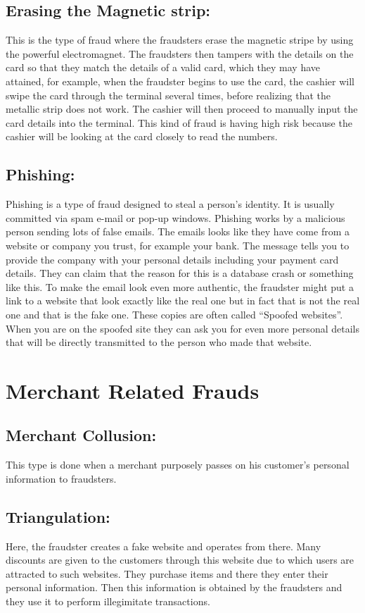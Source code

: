 \documentclass{report}
\begin{document}
\subsection{Erasing the Magnetic strip:}
This is the type of fraud where the fraudsters erase the magnetic stripe by using the powerful electromagnet. The fraudsters then tampers with the details on the card so that they match the details of a valid card, which they may have attained, for example, when the fraudster begins to use the card, the cashier will swipe the card through the terminal several times, before realizing that the metallic strip does not work. The cashier will then proceed to manually input the card details into the terminal. This kind of fraud is having high risk because the cashier will be looking at the card closely to read the numbers.

\subsection{Phishing:}
Phishing is a type of fraud designed to steal a person’s identity. It is usually committed via spam e-mail or pop-up windows. Phishing works by a malicious person sending lots of false emails. The emails looks like they have come from a website or company you trust, for example your bank. The message tells you to provide the company with your personal details including your payment card details. They can claim that the reason for this is a database crash or something like this. To make the email look even more authentic, the fraudster might put a link to a website that look exactly like the real one but in fact that is not the real one and that is the fake one. These copies are often called “Spoofed websites”. When you are on the spoofed site they can ask you for even more personal details that will be directly transmitted to the person who made that website.  

\section{Merchant Related Frauds}
\subsection{Merchant Collusion:}
This type is done when a merchant purposely passes on his customer’s personal information to fraudsters. 

\subsection{Triangulation:}
Here, the fraudster creates a fake website and operates from there. Many discounts are given to the customers through this website due to which users are attracted to such websites. They purchase items and there they enter their personal information. Then this information is obtained by the fraudsters and they use it to perform illegimitate transactions.  
\end{document}
